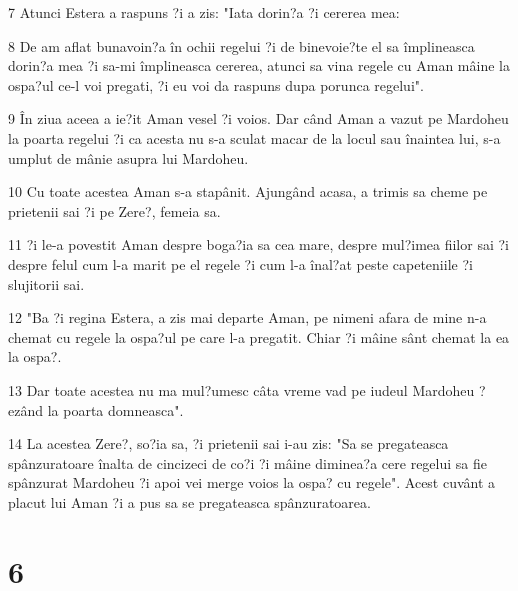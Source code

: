 \par 7 Atunci Estera a raspuns ?i a zis: "Iata dorin?a ?i cererea mea:
\par 8 De am aflat bunavoin?a în ochii regelui ?i de binevoie?te el sa împlineasca dorin?a mea ?i sa-mi împlineasca cererea, atunci sa vina regele cu Aman mâine la ospa?ul ce-l voi pregati, ?i eu voi da raspuns dupa porunca regelui".
\par 9 În ziua aceea a ie?it Aman vesel ?i voios. Dar când Aman a vazut pe Mardoheu la poarta regelui ?i ca acesta nu s-a sculat macar de la locul sau înaintea lui, s-a umplut de mânie asupra lui Mardoheu.
\par 10 Cu toate acestea Aman s-a stapânit. Ajungând acasa, a trimis sa cheme pe prietenii sai ?i pe Zere?, femeia sa.
\par 11 ?i le-a povestit Aman despre boga?ia sa cea mare, despre mul?imea fiilor sai ?i despre felul cum l-a marit pe el regele ?i cum l-a înal?at peste capeteniile ?i slujitorii sai.
\par 12 "Ba ?i regina Estera, a zis mai departe Aman, pe nimeni afara de mine n-a chemat cu regele la ospa?ul pe care l-a pregatit. Chiar ?i mâine sânt chemat la ea la ospa?.
\par 13 Dar toate acestea nu ma mul?umesc câta vreme vad pe iudeul Mardoheu ?ezând la poarta domneasca".
\par 14 La acestea Zere?, so?ia sa, ?i prietenii sai i-au zis: "Sa se pregateasca spânzuratoare înalta de cincizeci de co?i ?i mâine diminea?a cere regelui sa fie spânzurat Mardoheu ?i apoi vei merge voios la ospa? cu regele". Acest cuvânt a placut lui Aman ?i a pus sa se pregateasca spânzuratoarea.

\chapter{6}

